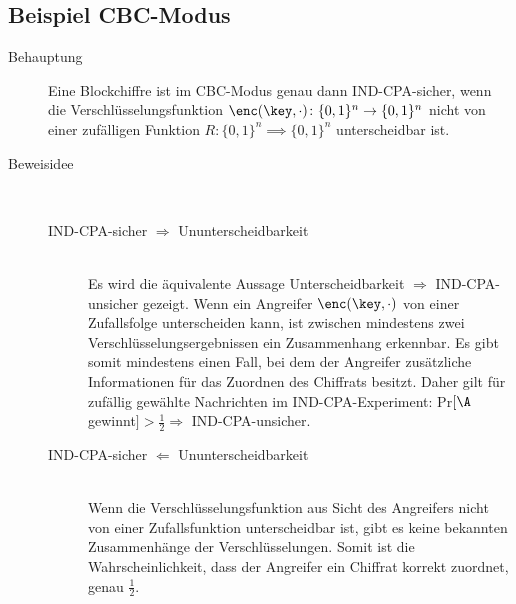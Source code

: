 \subsection{Beispiel CBC-Modus}
%
\begin{description} 
	\item[Behauptung] Eine Blockchiffre ist im CBC-Modus genau dann IND-CPA-sicher, wenn die Verschlüsselungsfunktion $\enc(\key,\cdot) \colon \{0,1\}^n \rightarrow \{0,1\}^n$ nicht von einer zufälligen Funktion $R \colon \{0,1\}^n \implies \{0,1\}^n$ unterscheidbar ist.
	\item[Beweisidee]~
	\begin{description}
		\item[IND-CPA-sicher $\Rightarrow$ Ununterscheidbarkeit ]~\\
		Es wird die äquivalente Aussage \glqq{}Unterscheidbarkeit $\Rightarrow$ IND-CPA-unsicher\grqq{} gezeigt. 
		Wenn ein Angreifer $\enc(\key, \cdot)$ von einer Zufallsfolge unterscheiden kann, ist zwischen mindestens zwei Verschlüsselungsergebnissen ein Zusammenhang erkennbar. Es gibt somit mindestens einen Fall, bei dem der Angreifer zusätzliche Informationen für das Zuordnen des Chiffrats besitzt. Daher gilt für zufällig gewählte Nachrichten im IND-CPA-Experiment: Pr$[\A$ gewinnt$] > \frac{1}{2} \Rightarrow$ IND-CPA-unsicher.
		\item[IND-CPA-sicher $\Leftarrow$ Ununterscheidbarkeit]~\\
		Wenn die Verschlüsselungsfunktion aus Sicht des Angreifers nicht von einer Zufallsfunktion unterscheidbar ist, gibt es keine bekannten Zusammenhänge der Verschlüsselungen. Somit ist die Wahrscheinlichkeit, dass der Angreifer ein Chiffrat korrekt zuordnet, genau $\frac{1}{2}$.
	\end{description}
\end{description}

